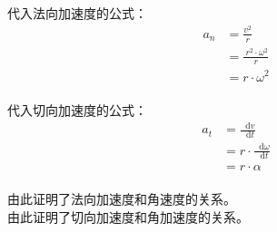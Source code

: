 \documentclass[UTF8]{ctexart}
\newcommand*{\dif}{\mathop{}\!\mathrm{d}}
\begin{document}
\newpage

    代入法向加速度的公式：
    \begin{align}
        a_n
        &=\frac{v^2}{r}\\[3mm]
        &=\frac{~r^2\cdot\omega^2}{r}\\[3mm]
        &=r\cdot\omega^2
    \end{align}\\
    代入切向加速度的公式：
    \begin{align}
        a_t
        &=\frac{\dif v}{\dif t}\\[3mm]
        &=r\cdot\frac{\dif \omega}{\dif t}\\[3mm]
        &=r\cdot\alpha
    \end{align}\\
    由此证明了法向加速度和角速度的关系。\\[3mm]
    由此证明了切向加速度和角加速度的关系。

\newpage
\end{document}
